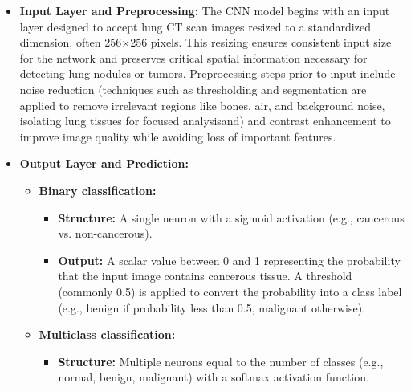 \begin{itemize}
    \item \textbf{Input Layer and Preprocessing:} The CNN model begins with an input layer designed 
    to accept lung CT scan images resized to a standardized dimension, often 256×256 pixels. This 
    resizing ensures consistent input size for the network and preserves critical spatial 
    information necessary for detecting lung nodules or tumors. Preprocessing steps prior to input 
    include noise reduction (techniques such as thresholding and segmentation are applied to remove 
    irrelevant regions like bones, air, and background noise, isolating lung tissues for focused 
    analysisand) and contrast enhancement to improve image quality while avoiding loss of important 
    features. \cite{aplb2024}

    \item \textbf{Output Layer and Prediction:} 
        \begin{itemize}
            \item \textbf{Binary classification:}
                \begin{itemize}
                    \item \textbf{Structure:} A single neuron with a sigmoid activation (e.g., 
                    cancerous vs. non-cancerous).
                    
                    \item \textbf{Output:} A scalar value between 0 and 1 representing the 
                    probability that the input image contains cancerous tissue. A threshold 
                    (commonly 0.5) is applied to convert the probability into a class label 
                    (e.g., benign if probability less than 0.5, malignant otherwise).
                \end{itemize}

            \item \textbf{Multiclass classification:} 
                \begin{itemize}
                    \item \textbf{Structure:} Multiple neurons equal to the number of classes (e.g., 
                    normal, benign, malignant) with a softmax activation function.
                    

\end{itemize}
\end{itemize}
\end{itemize}
